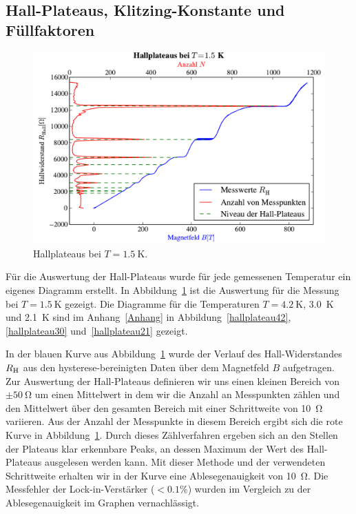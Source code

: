 \documentclass[paper=a4,fontsize=10pt,DIV=18,twocolumn,parskip=half]{scrartcl}
\numberwithin{equation}{section}    %
\begin{document}
% 
~~~~~~~~~~~~~~~~~~~~~~~~~~~~~~~~~~~~~~~~~~~~~~~~~~~~~~~~~~~~~~~~~~~~~~~~~~~~~
\subsection{Hall-Plateaus, Klitzing-Konstante und Füllfaktoren}
\label{a1}

\begin{figure}[htp]
	\begin{center}
		\includegraphics[width=\columnwidth]{Data-Plots/05-1,5-Hallplateaus.pdf}
		\caption{Hallplateaus bei $T=\SI{1.5}{\kelvin}$.}
		\label{hallplateau}
	\end{center}
\end{figure}

Für die Auswertung der Hall-Plateaus wurde für jede gemessenen Temperatur ein eigenes Diagramm erstellt. In Abbildung~\ref{hallplateau} ist die Auswertung für die Messung bei $T=\SI{1.5}{\kelvin}$ gezeigt. Die Diagramme für die Temperaturen $T = \SI{4.2}{\kelvin}$, \SI{3.0}{\kelvin} und \SI{2.1}{\kelvin} sind im Anhang~\ref{Anhang} in Abbildung~\ref{hallplateau42}, \ref{hallplateau30} und~\ref{hallplateau21} gezeigt.

In der blauen Kurve aus Abbildung~\ref{hallplateau} wurde der Verlauf des Hall-Widerstandes $R_{\rm H}$ aus den hysterese-bereinigten Daten über dem Magnetfeld $B$ aufgetragen.
Zur Auswertung der Hall-Plateaus definieren wir uns einen kleinen Bereich von $\pm \SI{50}{\ohm}$ um einen Mittelwert in dem wir die Anzahl an Messpunkten zählen und den Mittelwert über den gesamten Bereich mit einer Schrittweite von \SI{10}{\ohm} variieren. Aus der Anzahl der Messpunkte in diesem Bereich ergibt sich die rote Kurve in Abbildung~\ref{hallplateau}. %
Durch dieses Zählverfahren ergeben sich an den Stellen der Plateaus klar erkennbare Peaks, an dessen Maximum der Wert des Hall-Plateaus ausgelesen werden kann. Mit dieser Methode und der verwendeten Schrittweite erhalten wir in der Kurve eine Ablesegenauigkeit von \SI{10}{\ohm}. Die Messfehler der Lock-in-Verstärker ($<0.1\%$) wurden im Vergleich zu der Ablesegenauigkeit im Graphen vernachlässigt. 
\end{document}
